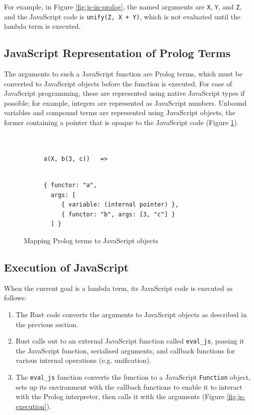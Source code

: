 For example, in Figure \ref{fig:js-in-prolog}, the named arguments are \texttt{X}, \texttt{Y}, and \texttt{Z}, and the JavaScript code is \texttt{unify(Z, X + Y)}, which is not evaluated until the lambda term is executed.

\subsection{JavaScript Representation of Prolog Terms}

\label{sec:js-prolog-mapping}

The arguments to such a JavaScript function are Prolog terms, which must be converted to JavaScript objects before the function is executed. For ease of JavaScript programming, these are represented using native JavaScript types if possible; for example, integers are represented as JavaScript numbers. Unbound variables and compound terms are represented using JavaScript objects, the former containing a pointer that is opaque to the JavaScript code (Figure \ref{fig:prolog-js-mapping}).

\begin{figure}[H]
\centering
\begin{subfigure}{0.3\textwidth}
\centering
\begin{verbatim}


a(X, b(3, c))   =>


\end{verbatim}
\end{subfigure}%
\begin{subfigure}{0.7\textwidth}
\centering
\begin{verbatim}
{ functor: "a",
  args: [
     { variable: (internal pointer) },
     { functor: "b", args: [3, "c"] }
  ] }
\end{verbatim}
\end{subfigure}
\caption{Mapping Prolog terms to JavaScript objects}
\label{fig:prolog-js-mapping}
\end{figure}

\subsection{Execution of JavaScript}

When the current goal is a lambda term, its JavaScript code is executed as follows:

\begin{enumerate}
\item The Rust code converts the arguments to JavaScript objects as described in the previous section.
\item Rust calls out to an external JavaScript function called \texttt{eval\_js}, passing it the JavaScript function, serialised arguments, and callback functions for various internal operations (e.g. unification).
\item The \texttt{eval\_js} function converts the function to a JavaScript \texttt{Function} object, sets up its environment with the callback functions to enable it to interact with the Prolog interpreter, then calls it with the arguments (Figure \ref{fig:js-execution}).
\end{enumerate}


